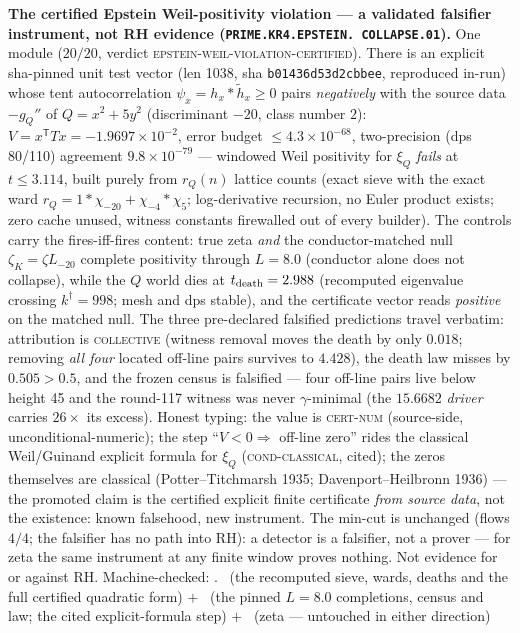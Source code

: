 \par\smallskip\noindent\textbf{The certified Epstein
Weil-positivity violation --- a validated falsifier instrument,
not RH evidence
(\texttt{PRIME.KR4.\allowbreak EPSTEIN.\allowbreak
COLLAPSE.01}).}
One module ($20/20$, verdict
\textsc{epstein-weil-violation-certified}).  There is an explicit
sha-pinned unit test vector (len 1038, sha
\texttt{b01436d53d2cbbee}, reproduced in-run) whose tent
autocorrelation $\psi_x = h_x * \tilde h_x \ge 0$ pairs
\emph{negatively} with the source data $-g_Q''$ of
$Q = x^2 + 5y^2$ (discriminant $-20$, class number $2$):
$V = x^{\mathsf T} T x = -1.9697\times10^{-2}$, error budget
$\le 4.3\times10^{-68}$, two-precision (dps 80/110) agreement
$9.8\times10^{-79}$ --- windowed Weil positivity for $\xi_Q$
\emph{fails} at $t \le 3.114$, built purely from $r_Q(n)$ lattice
counts (exact sieve with the exact ward
$r_Q = 1*\chi_{-20} + \chi_{-4}*\chi_5$; log-derivative
recursion, no Euler product exists; zero cache unused, witness
constants firewalled out of every builder).  The controls carry
the fires-iff-fires content: true zeta \emph{and} the
conductor-matched null $\zeta_K = \zeta L_{-20}$ complete
positivity through $L = 8.0$ (conductor alone does not collapse),
while the $Q$ world dies at $t_{\rm death} = 2.988$ (recomputed
eigenvalue crossing $k^\dagger = 998$; mesh and dps stable), and
the certificate vector reads \emph{positive} on the matched null.
The three pre-declared falsified predictions travel verbatim:
attribution is \textsc{collective} (witness removal moves the
death by only $0.018$; removing \emph{all four} located off-line
pairs survives to $4.428$), the death law misses by
$0.505 > 0.5$, and the frozen census is falsified --- four
off-line pairs live below height 45 and the round-117 witness was
never $\gamma$-minimal (the $15.6682$ \emph{driver} carries
$26\times$ its excess).  Honest typing: the value is
\textsc{cert-num} (source-side, unconditional-numeric); the step
``$V < 0 \Rightarrow$ off-line zero'' rides the classical
Weil/Guinand explicit formula for $\xi_Q$
(\textsc{cond-classical}, cited); the zeros themselves are
classical (Potter--Titchmarsh 1935; Davenport--Heilbronn 1936)
--- the promoted claim is the certified explicit finite
certificate \emph{from source data}, not the existence:
known falsehood, new instrument.  The min-cut is unchanged
(flows $4/4$; the falsifier has no path into RH): a detector is a
falsifier, not a prover --- for zeta the same instrument at any
finite window proves nothing.  Not evidence for or against RH.
Machine-checked: .
\mE\ (the recomputed sieve, wards, deaths and the full certified
quadratic form) $+$ \mC\ (the pinned $L = 8.0$ completions,
census and law; the cited explicit-formula step) $+$ \mO\ (zeta
--- untouched in either direction)
\par\smallskip


